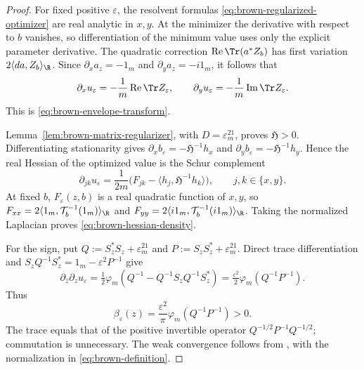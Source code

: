 \begin{proof}
For fixed positive $\varepsilon$, the resolvent formulas \eqref{eq:brown-regularized-optimizer} are real analytic in $x,y$.
At the minimizer the derivative with respect to $b$ vanishes, so differentiation of the minimum value uses only the explicit parameter derivative.
The quadratic correction $\operatorname{Re}\Tr(a^*Z_b)$ has first variation $2\langle da,Z_b\rangle_{\R}$.
Since $\partial_xa_z=-1_m$ and $\partial_ya_z=-i1_m$, it follows that
\[
 \partial_xu_\varepsilon=-\frac1m\operatorname{Re}\Tr Z_\varepsilon,
 \qquad
 \partial_yu_\varepsilon=-\frac1m\operatorname{Im}\Tr Z_\varepsilon.
\]
This is \eqref{eq:brown-envelope-transform}.

Lemma~\ref{lem:brown-matrix-regularizer}, with $D=\varepsilon^21_m$, proves $\mathfrak H>0$.
Differentiating stationarity gives $\partial_xb_\varepsilon=-\mathfrak H^{-1}h_x$ and $\partial_yb_\varepsilon=-\mathfrak H^{-1}h_y$.
Hence the real Hessian of the optimized value is the Schur complement
\begin{equation}\label{eq:brown-value-hessian}
 \partial_{jk}u_\varepsilon
  =\frac1{2m}\bigl(F_{jk}
        -\langle h_j,\mathfrak H^{-1}h_k\rangle\bigr),
 \qquad j,k\in\{x,y\}.
\end{equation}
At fixed $b$, $F_\varepsilon(z,b)$ is a real quadratic function of $x,y$, so $F_{xx}=2\langle1_m,\mathcal T_b^{-1}(1_m)\rangle_{\R}$ and $F_{yy}=2\langle i1_m,\mathcal T_b^{-1}(i1_m)\rangle_{\R}$.
Taking the normalized Laplacian proves \eqref{eq:brown-hessian-density}.

For the sign, put $Q:=S_z^*S_z+\varepsilon^21_m$ and $P:=S_zS_z^*+\varepsilon^21_m$.
Direct trace differentiation and $S_zQ^{-1}S_z^*=1_m-\varepsilon^2P^{-1}$ give
\[
 \partial_{\bar z}\partial_z u_\varepsilon
  =\tfrac12\varphi_m(Q^{-1}-Q^{-1}S_zQ^{-1}S_z^*)
  =\tfrac{\varepsilon^2}{2}\varphi_m(Q^{-1}P^{-1}).
\]
Thus
\begin{equation}\label{eq:positive-density}
 \beta_\varepsilon(z)=\frac{\varepsilon^2}{\pi}
                         \varphi_m(Q^{-1}P^{-1})>0.
\end{equation}
The trace equals that of the positive invertible operator $Q^{-1/2}P^{-1}Q^{-1/2}$; commutation is unnecessary.
The weak convergence follows from \cite[Chapter 11, Section 9, (11.14)--(11.15)]{MS17}, with the normalization in \eqref{eq:brown-definition}.
\end{proof}

